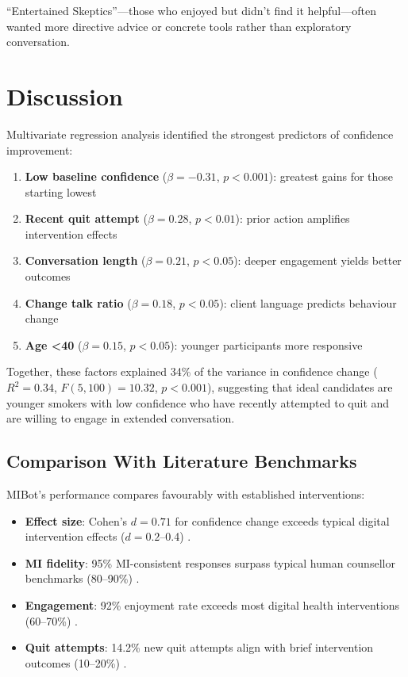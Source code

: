 ``Entertained Skeptics''---those who enjoyed but didn't find it helpful---often wanted more directive advice or concrete tools rather than exploratory conversation.


\section{Discussion}
\label{sec:synthesis}



Multivariate regression analysis identified the strongest predictors of confidence improvement:

\begin{enumerate}
\item \textbf{Low baseline confidence} ($\beta=-0.31$, $p<0.001$): greatest gains for those starting lowest
\item \textbf{Recent quit attempt} ($\beta=0.28$, $p<0.01$): prior action amplifies intervention effects
\item \textbf{Conversation length} ($\beta=0.21$, $p<0.05$): deeper engagement yields better outcomes
\item \textbf{Change talk ratio} ($\beta=0.18$, $p<0.05$): client language predicts behaviour change
\item \textbf{Age <40} ($\beta=0.15$, $p<0.05$): younger participants more responsive
\end{enumerate}

Together, these factors explained 34\% of the variance in confidence change ($R^2=0.34$, $F(5,100)=10.32$, $p<0.001$), suggesting that ideal candidates are younger smokers with low confidence who have recently attempted to quit and are willing to engage in extended conversation.

\subsection*{Comparison With Literature Benchmarks}

MIBot's performance compares favourably with established interventions:

\begin{itemize}
\item \textbf{Effect size}: Cohen's $d=0.71$ for confidence change exceeds typical digital intervention effects ($d=0.2$--0.4) \citep{Whittaker2016}.
\item \textbf{MI fidelity}: 95\% MI-consistent responses surpass typical human counsellor benchmarks (80--90\%) \citep{Moyers2016}.
\item \textbf{Engagement}: 92\% enjoyment rate exceeds most digital health interventions (60--70\%) \citep{Perski2017}.
\item \textbf{Quit attempts}: 14.2\% new quit attempts align with brief intervention outcomes (10--20\%) \citep{Stead2013}.
\end{itemize}

